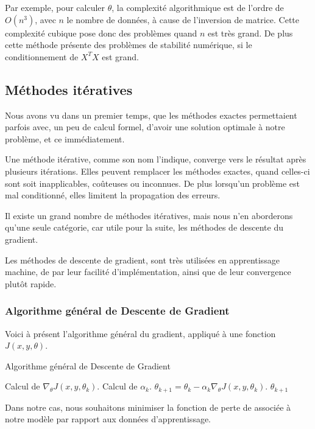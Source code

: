 \documentclass[a4paper, 10pt]{report}
\begin{document}
Par exemple, pour calculer $\theta$, la complexité algorithmique est de l'ordre de $O(n^3)$, avec $n$ le nombre de données, à cause de l'inversion de matrice.
Cette complexité cubique pose donc des problèmes quand $n$ est très grand.
De plus cette méthode présente des problèmes de stabilité numérique, si le conditionnement de $X^TX$ est grand.
		
\subsection{Méthodes itératives}
Nous avons vu dans un premier temps, que les méthodes exactes permettaient parfois avec, un peu de calcul formel, d'avoir une solution optimale à notre problème, et ce immédiatement.

Une méthode itérative, comme son nom l'indique, converge vers le résultat après plusieurs itérations.
Elles peuvent remplacer les méthodes exactes, quand celles-ci sont soit inapplicables, coûteuses ou inconnues. De plus lorsqu'un problème est mal conditionné, elles limitent la propagation des erreurs.

Il existe un grand nombre de méthodes itératives, mais nous n'en aborderons qu'une seule catégorie, car utile pour la suite, les méthodes de descente du gradient.

Les méthodes de descente de gradient, sont très utilisées en apprentissage machine, de par leur facilité d'implémentation, ainsi que de leur convergence plutôt rapide.
\subsubsection{Algorithme général de Descente de Gradient}
Voici à présent l'algorithme général du gradient, appliqué à une fonction $J(x,y,\theta)$.
\begin{algorithm}[H]
	\caption{Algorithme général de Descente de Gradient}
	\begin{algorithmic}
		\REPEAT
		\STATE Calcul de $\nabla_\theta J(x,y,\theta_k)$.
		\STATE Calcul de $\alpha_k$.
		\STATE $\theta_{k+1} = \theta_k - \alpha_k \nabla_\theta J(x,y,\theta_k)$.
		\RETURN $\theta_{k+1}$
	\end{algorithmic}
\end{algorithm}
Dans notre cas, nous souhaitons minimiser la fonction de perte de associée à notre modèle par rapport aux données d'apprentissage.
\end{document}
